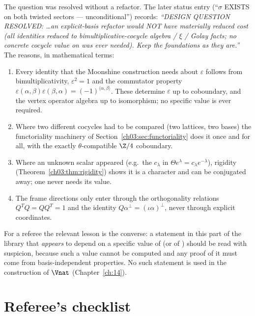 The question was resolved without a refactor. The later status entry (``$\sigma$ EXISTS on both
twisted sectors --- unconditional'') records: \emph{``DESIGN QUESTION RESOLVED: \ldots an
explicit-basis refactor would NOT have materially reduced cost (all identities reduced to
bimultiplicative-cocycle algebra / $\xi$ / Golay facts; no concrete cocycle value on
 was ever needed). Keep the foundations as they are.''} The reasons, in
mathematical terms:
\begin{enumerate}
\item Every identity that the Moonshine construction needs about $\varepsilon$ follows from
  bimultiplicativity, $\varepsilon^2=1$ and the commutator property
  $\varepsilon(\alpha,\beta)\varepsilon(\beta,\alpha)=(-1)^{\langle\alpha,\beta\rangle}$. These
  determine $\varepsilon$ up to coboundary, and the vertex operator algebra up to isomorphism; no
  specific value is ever required.
\item Where two different cocycles had to be compared (two lattices, two bases) the functoriality
  machinery of Section~\ref{ch03:sec:functoriality} does it once and for all, with the exactly
  $\theta$-compatible $\Z/4$ coboundary.
\item Where an unknown scalar appeared (e.g.\ the $c_\lambda$ in $\Theta e^\lambda=c_\lambda
  e^{-\lambda}$), rigidity (Theorem~\ref{ch03:thm:rigidity}) shows it is a character and can be
  conjugated away; one never needs its value.
\item The frame directions only enter through the orthogonality relations $Q^TQ=QQ^T=1$ and the
  identity $Q\alpha^\perp=(\iota\alpha)^\perp$, never through explicit coordinates.
\end{enumerate}

\begin{warning}
For a referee the relevant lesson is the converse: a statement in this part of the library that
\emph{appears} to depend on a specific value of  (or of )
should be read with suspicion, because such a value cannot be computed and any proof of it must
come from basis-independent properties. No such statement is used in the construction of
$\Vnat$ (Chapter~\ref{ch:14}).
\end{warning}

\section{Referee's checklist}\label{ch03:sec:checklist}

